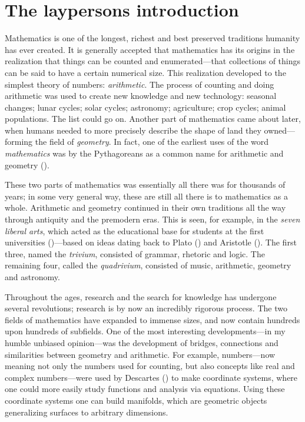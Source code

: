 
\section{The laypersons introduction}
\label{ch0:layperson}

Mathematics is one of the longest, richest and best preserved traditions humanity has ever created. It is generally accepted that mathematics has its origins in the realization that things can be counted and enumerated---that collections of things can be said to have a certain numerical size. This realization developed to the simplest theory of numbers: \emph{arithmetic}. The process of counting and doing arithmetic was used to create new knowledge and new technology: seasonal changes; lunar cycles; solar cycles; astronomy; agriculture; crop cycles; animal populations. The list could go on. Another part of mathematics came about later, when humans needed to more precisely describe the shape of land they owned---forming the field of \emph{geometry}. In fact, one of the earliest uses of the word \emph{mathematics} was by the Pythagoreans as a common name for arithmetic and geometry (\cite[1.1]{history}).

These two parts of mathematics was essentially all there was for thousands of years; in some very general way, these are still all there is to mathematics as a whole. Arithmetic and geometry continued in their own traditions all the way through antiquity and the premodern eras. This is seen, for example, in the \emph{seven liberal arts}, which acted as the educational base for students at the first universities (\cite{universities})---based on ideas dating back to Plato (\cite{plato}) and Aristotle (\cite{aristotle}). The first three, named the \emph{trivium}, consisted of grammar, rhetoric and logic. The remaining four, called the \emph{quadrivium}, consisted of music, arithmetic, geometry and astronomy.

Throughout the ages, research and the search for knowledge has undergone several revolutions; research is by now an incredibly rigorous process. The two fields of mathematics have expanded to immense sizes, and now contain hundreds upon hundreds of subfields. One of the most interesting developments---in my humble unbiased opinion---was the development of bridges, connections and similarities between geometry and arithmetic. For example, numbers---now meaning not only the numbers used for counting, but also concepts like real and complex numbers---were used by Descartes (\cite{descartes}) to make coordinate systems, where one could more easily study functions and analysis via equations. Using these coordinate systems one can build manifolds, which are geometric objects generalizing surfaces to arbitrary dimensions. 

